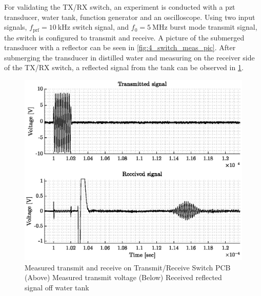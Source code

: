 For validating the TX/RX switch, an experiment is conducted with a \gls{pzt} transducer, water tank, function generator and an oscilloscope. Using two input signals, $f_{\mathrm{prf}}=\qty{10}{\kilo\hertz}$ switch signal, and $f_{0}=\qty{5}{\mega\hertz}$ burst mode transmit signal, the switch is configured to transmit and receive. A picture of the submerged transducer with a reflector can be seen in \cref{fig:4_switch_meas_pic}. After submerging the transducer in distilled water and measuring on the receiver side of the TX/RX switch, a reflected signal from the tank can be observed in \cref{fig:4_txrx_meas}.
\begin{figure}[htbp]
	\centering
	\includegraphics[width=.8\textwidth]{Figures/4_switch_pcb_meas.eps}
	\caption[Measured transmit and receive on Transmit/Receive Switch PCB]{Measured transmit and receive on Transmit/Receive Switch PCB (Above) Measured transmit voltage (Below) Received reflected signal off water tank}
	\label{fig:4_txrx_meas}
\end{figure}
